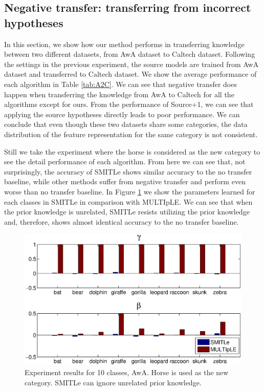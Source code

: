 \subsection{Negative transfer: transferring from incorrect hypotheses}
In this section, we show how our method performs in transferring knowledge between two different datasets, from AwA dataset to Caltech dataset. Following the settings in the previous experiment, the source models are trained from AwA dataset and transferred to Caltech dataset. %
We show the average performance of each algorithm in Table \ref{tab:A2C}. We can see that negative transfer does happen when transferring the knowledge from AwA to Caltech for all the algorithms except for ours. From the performance of Source+1, we can see that applying the source hypotheses directly leads to poor performance. We can conclude that even though these two datasets share some categories, the data distribution of the feature representation for the same category is not consistent. 

Still we take the experiment where the horse is considered as the new category to see the detail performance of each algorithm. %
From here we can see that, not surprisingly, the accuracy of SMITLe shows similar accuracy to the no transfer baseline, while other methods suffer from negative transfer and perform even worse than no transfer baseline. In Figure \ref{fig:a2c} we show the parameters learned for each classes in SMITLe in comparison with MULTIpLE. We can see that when the prior knowledge is unrelated, SMITLe resists utilizing the prior knowledge and, therefore, shows almost identical accuracy to the no transfer baseline.

\begin{figure}
    \centering
     \includegraphics[scale=0.25]{fig/A2C_gama.eps} %
    \caption{Experiment results for 10 classes, AwA. Horse is used as the new category. SMITLe can ignore unrelated prior knowledge.}
    \label{fig:a2c}
\end{figure}


